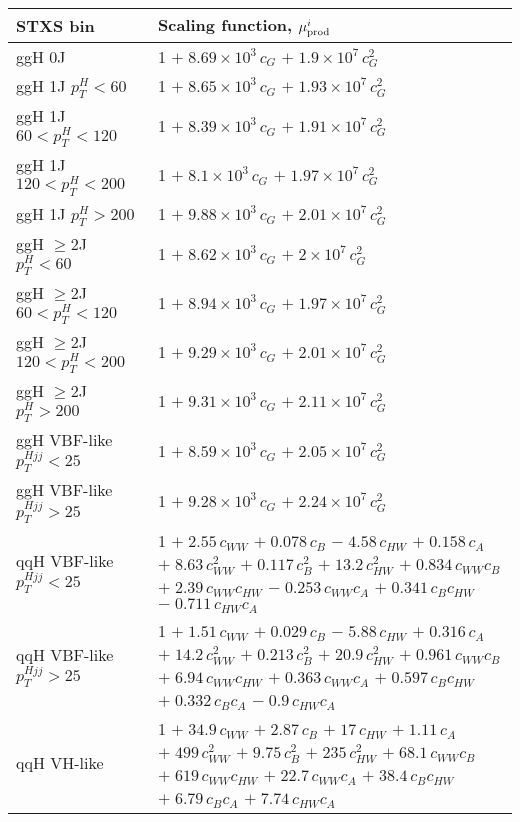 \begin{tabular}{l|p{}}
    STXS bin & Scaling function, $\mu^i_{\rm{prod}}$ \\ \hline
    ggH 0J & 1 $+\;8.69\times 10^{3}\,c_{G}$ $+\;1.9\times 10^{7}\,c_{G}^{2}$ \\
    ggH 1J $p_{T}^{H} < 60$ & 1 $+\;8.65\times 10^{3}\,c_{G}$ $+\;1.93\times 10^{7}\,c_{G}^{2}$ \\
    ggH 1J $60 < p_{T}^{H} < 120$ & 1 $+\;8.39\times 10^{3}\,c_{G}$ $+\;1.91\times 10^{7}\,c_{G}^{2}$ \\
    ggH 1J $120 < p_{T}^{H} < 200$ & 1 $+\;8.1\times 10^{3}\,c_{G}$ $+\;1.97\times 10^{7}\,c_{G}^{2}$ \\
    ggH 1J $p_{T}^{H} > 200$ & 1 $+\;9.88\times 10^{3}\,c_{G}$ $+\;2.01\times 10^{7}\,c_{G}^{2}$ \\
    ggH $\geq$2J $p_{T}^{H} < 60$ & 1 $+\;8.62\times 10^{3}\,c_{G}$ $+\;2\times 10^{7}\,c_{G}^{2}$ \\
    ggH $\geq$2J $60 < p_{T}^{H} < 120$ & 1 $+\;8.94\times 10^{3}\,c_{G}$ $+\;1.97\times 10^{7}\,c_{G}^{2}$ \\
    ggH $\geq$2J $120 < p_{T}^{H} < 200$ & 1 $+\;9.29\times 10^{3}\,c_{G}$ $+\;2.01\times 10^{7}\,c_{G}^{2}$ \\
    ggH $\geq$2J $p_{T}^{H} > 200$ & 1 $+\;9.31\times 10^{3}\,c_{G}$ $+\;2.11\times 10^{7}\,c_{G}^{2}$ \\
    ggH VBF-like $p_T^{Hjj}<25$ & 1 $+\;8.59\times 10^{3}\,c_{G}$ $+\;2.05\times 10^{7}\,c_{G}^{2}$ \\
    ggH VBF-like $p_T^{Hjj}>25$ & 1 $+\;9.28\times 10^{3}\,c_{G}$ $+\;2.24\times 10^{7}\,c_{G}^{2}$ \\
    \hline
    qqH VBF-like $p_T^{Hjj}<25$ & 1 $+\;2.55\,c_{WW}$ $+\;0.078\,c_{B}$ $-\;4.58\,c_{HW}$ $+\;0.158\,c_{A}$ $+\;8.63\,c_{WW}^{2}$ $+\;0.117\,c_{B}^{2}$ $+\;13.2\,c_{HW}^{2}$ $+\;0.834\,c_{WW}c_{B}$ $+\;2.39\,c_{WW}c_{HW}$ $-\;0.253\,c_{WW}c_{A}$ $+\;0.341\,c_{B}c_{HW}$ $-\;0.711\,c_{HW}c_{A}$ \\
    qqH VBF-like $p_T^{Hjj}>25$ & 1 $+\;1.51\,c_{WW}$ $+\;0.029\,c_{B}$ $-\;5.88\,c_{HW}$ $+\;0.316\,c_{A}$ $+\;14.2\,c_{WW}^{2}$ $+\;0.213\,c_{B}^{2}$ $+\;20.9\,c_{HW}^{2}$ $+\;0.961\,c_{WW}c_{B}$ $+\;6.94\,c_{WW}c_{HW}$ $+\;0.363\,c_{WW}c_{A}$ $+\;0.597\,c_{B}c_{HW}$ $+\;0.332\,c_{B}c_{A}$ $-\;0.9\,c_{HW}c_{A}$ \\
    qqH VH-like & 1 $+\;34.9\,c_{WW}$ $+\;2.87\,c_{B}$ $+\;17\,c_{HW}$ $+\;1.11\,c_{A}$ $+\;499\,c_{WW}^{2}$ $+\;9.75\,c_{B}^{2}$ $+\;235\,c_{HW}^{2}$ $+\;68.1\,c_{WW}c_{B}$ $+\;619\,c_{WW}c_{HW}$ $+\;22.7\,c_{WW}c_{A}$ $+\;38.4\,c_{B}c_{HW}$ $+\;6.79\,c_{B}c_{A}$ $+\;7.74\,c_{HW}c_{A}$ \\

\end{tabular}
